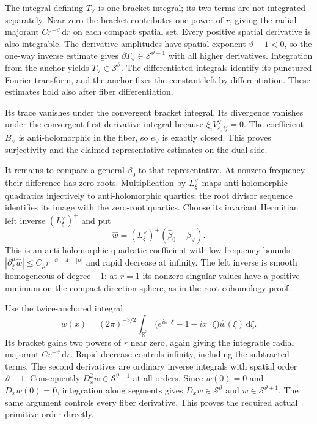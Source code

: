 \documentclass[
  english,
  11pt,
  reqno]{amsart}
\begin{document}
The integral defining \(T_\vee\) is one bracket integral; its two terms
are not integrated separately. Near zero the bracket contributes one
power of \(r\), giving the radial majorant
\(Cr^{-\vartheta}\,\mathrm dr\) on each compact spatial set. Every
positive spatial derivative is also integrable. The derivative
amplitudes have spatial exponent \(\vartheta-1<0\), so the one-way
inverse estimate gives \(\partial T_\vee\in\mathscr S^{\vartheta-1}\)
with all higher derivatives. Integration from the anchor yields
\(T_\vee\in\mathscr S^\vartheta\). The differentiated integrals identify
its punctured Fourier transform, and the anchor fixes the constant left
by differentiation. These estimates hold also after fiber
differentiation.

Its trace vanishes under the convergent bracket integral. Its divergence
vanishes under the convergent first-derivative integral because
\(\xi_iV^\vee_{\varepsilon,ij}=0\). The coefficient \(B_\vee\) is
anti-holomorphic in the fiber, so \(e_\vee\) is exactly closed. This
proves surjectivity and the claimed representative estimates on the dual
side.

It remains to compare a general \(\beta_0\) to that representative. At
nonzero frequency their difference has zero roots. Multiplication by
\(L_\xi^\vee\) maps anti-holomorphic quadratics injectively to
anti-holomorphic quartics; the root divisor sequence identifies its
image with the zero-root quartics. Choose its invariant Hermitian left
inverse \((L_\xi^\vee)^+\) and put%
 \[
\widehat w=(L_\xi^\vee)^+
               (\widehat\beta_0-\beta_\vee).
\] This is an anti-holomorphic quadratic coefficient with low-frequency
bounds \(|\partial_\xi^\mu\widehat w|
\le C_\mu r^{-\vartheta-4-|\mu|}\) and rapid decrease at infinity. The
left inverse is smooth homogeneous of degree \(-1\): at \(r=1\) its
nonzero singular values have a positive minimum on the compact direction
sphere, as in the root-cohomology proof.

Use the twice-anchored integral%
 \[
w(x)=(2\pi)^{-3/2}\int_{\mathbb R^3}
\bigl(e^{ix\cdot\xi}-1-ix\cdot\xi\bigr)
\widehat w(\xi)\,\mathrm d\xi .
\] Its bracket gains two powers of \(r\) near zero, again giving the
integrable radial majorant \(Cr^{-\vartheta}\,\mathrm dr\). Rapid
decrease controls infinity, including the subtracted terms. The second
derivatives are ordinary inverse integrals with spatial order
\(\vartheta-1\). Consequently \(D_x^2w\in\mathscr S^{\vartheta-1}\) at
all orders. Since \(w(0)=0\) and \(D_xw(0)=0\), integration along
segments gives \(D_xw\in\mathscr S^\vartheta\) and
\(w\in\mathscr S^{\vartheta+1}\). The same argument controls every fiber
derivative. This proves the required actual primitive order directly.
\end{document}
